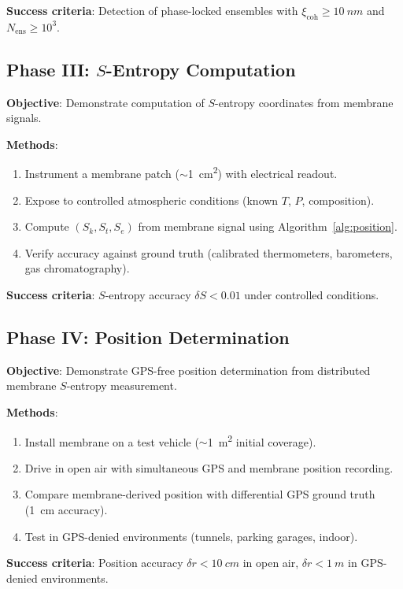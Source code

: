 \documentclass[12pt]{article}
\theoremstyle{definition}
\theoremstyle{remark}
\newcommand{\Sk}{S_k}
\newcommand{\St}{S_t}
\newcommand{\Se}{S_e}
\newcommand{\xicoh}{\xi_{\mathrm{coh}}}
\newcommand{\Nens}{N_{\mathrm{ens}}}
\begin{document}
\textbf{Success criteria}: Detection of phase-locked ensembles with $\xicoh \geq \SI{10}{nm}$ and $\Nens \geq 10^3$.

\subsection{Phase III: $S$-Entropy Computation}

\textbf{Objective}: Demonstrate computation of $S$-entropy coordinates from membrane signals.

\textbf{Methods}:
\begin{enumerate}[label=\arabic*.]
  \item Instrument a membrane patch ($\sim$\SI{1}{cm^2}) with electrical readout.
  \item Expose to controlled atmospheric conditions (known $T$, $P$, composition).
  \item Compute $(\Sk, \St, \Se)$ from membrane signal using Algorithm~\ref{alg:position}.
  \item Verify accuracy against ground truth (calibrated thermometers, barometers, gas chromatography).
\end{enumerate}

\textbf{Success criteria}: $S$-entropy accuracy $\delta S < 0.01$ under controlled conditions.

\subsection{Phase IV: Position Determination}

\textbf{Objective}: Demonstrate GPS-free position determination from distributed membrane $S$-entropy measurement.

\textbf{Methods}:
\begin{enumerate}[label=\arabic*.]
  \item Install membrane on a test vehicle ($\sim$\SI{1}{m^2} initial coverage).
  \item Drive in open air with simultaneous GPS and membrane position recording.
  \item Compare membrane-derived position with differential GPS ground truth (\SI{1}{cm} accuracy).
  \item Test in GPS-denied environments (tunnels, parking garages, indoor).
\end{enumerate}

\textbf{Success criteria}: Position accuracy $\delta r < \SI{10}{cm}$ in open air, $\delta r < \SI{1}{m}$ in GPS-denied environments.
\end{document}
